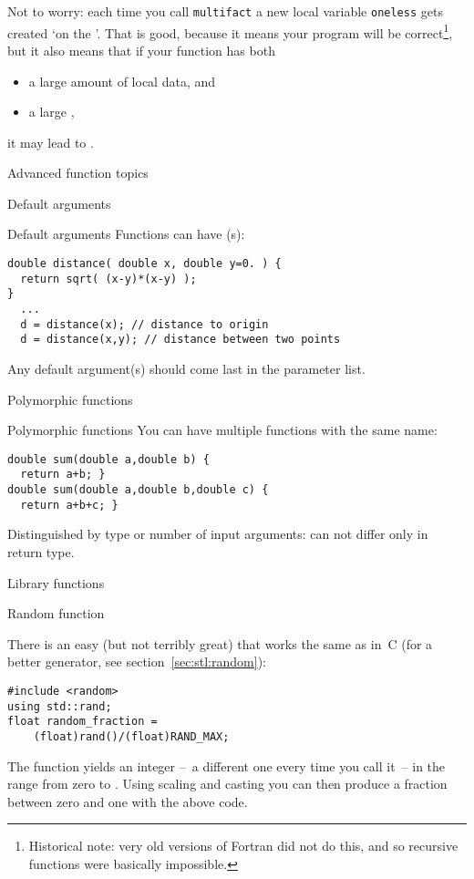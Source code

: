 Not to worry: each time you call \lstinline{multifact} a new local variable
\lstinline{oneless} gets created `on the '. That is good, because it means your program
will be correct\footnote{Historical note: very old versions of Fortran
  did not do this, and so recursive functions were basically
  impossible.}, but it also means that if your function has both
\begin{itemize}
\item a large amount of local data, and
\item a large ,
\end{itemize}
it may lead to .

 {Advanced function topics}

 {Default arguments}

\begin{block}{Default arguments}
  \label{sl:def-arg}
  Functions can have (s):
\begin{lstlisting}
double distance( double x, double y=0. ) {
  return sqrt( (x-y)*(x-y) );
}
  ...
  d = distance(x); // distance to origin
  d = distance(x,y); // distance between two points
\end{lstlisting}
Any default argument(s) should come last in the parameter list.
\end{block}

 {Polymorphic functions}
\label{sec:polyfunc}

\begin{block}{Polymorphic functions}
  \label{sl:func-poly}
  You can have multiple functions with the same name:
\begin{lstlisting}
double sum(double a,double b) {
  return a+b; }
double sum(double a,double b,double c) {
  return a+b+c; }
\end{lstlisting}
Distinguished by type or number of input arguments: can not differ only in return type.
\end{block}

 {Library functions}

 {Random function}
\label{sec:crand}

There is an easy (but not terribly great)
that works the same as in~C (for a better
generator, see section~\ref{sec:stl:random}):
%
\begin{lstlisting}
#include <random>
using std::rand;
float random_fraction =
    (float)rand()/(float)RAND_MAX;
\end{lstlisting}
%
The function  yields an integer --~a different one
every time you call it~-- in the range from zero to
.
Using scaling and casting you can then produce a fraction between zero
and one with the above code.

